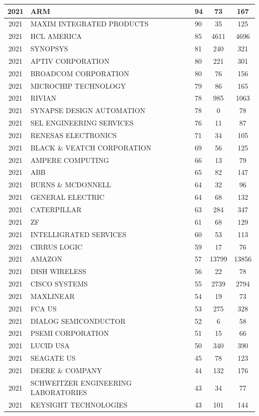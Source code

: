 \documentclass{article}%
\begin{document}
\begin{longtable}{c|p{20em}|p{5em}|c|c}
\hline%
2021&ARM&94&73&167\\%
\hline%
2021&MAXIM INTEGRATED PRODUCTS&90&35&125\\%
\hline%
2021&HCL AMERICA&85&4611&4696\\%
\hline%
2021&SYNOPSYS&81&240&321\\%
\hline%
2021&APTIV CORPORATION&80&221&301\\%
\hline%
2021&BROADCOM CORPORATION&80&76&156\\%
\hline%
2021&MICROCHIP TECHNOLOGY&79&86&165\\%
\hline%
2021&RIVIAN&78&985&1063\\%
\hline%
2021&SYNAPSE DESIGN AUTOMATION&78&0&78\\%
\hline%
2021&SEL ENGINEERING SERVICES&76&11&87\\%
\hline%
2021&RENESAS ELECTRONICS&71&34&105\\%
\hline%
2021&BLACK \& VEATCH CORPORATION&69&56&125\\%
\hline%
2021&AMPERE COMPUTING&66&13&79\\%
\hline%
2021&ABB&65&82&147\\%
\hline%
2021&BURNS \& MCDONNELL&64&32&96\\%
\hline%
2021&GENERAL ELECTRIC&64&68&132\\%
\hline%
2021&CATERPILLAR&63&284&347\\%
\hline%
2021&ZF&61&68&129\\%
\hline%
2021&INTELLIGRATED SERVICES&60&53&113\\%
\hline%
2021&CIRRUS LOGIC&59&17&76\\%
\hline%
2021&AMAZON&57&13799&13856\\%
\hline%
2021&DISH WIRELESS&56&22&78\\%
\hline%
2021&CISCO SYSTEMS&55&2739&2794\\%
\hline%
2021&MAXLINEAR&54&19&73\\%
\hline%
2021&FCA US&53&275&328\\%
\hline%
2021&DIALOG SEMICONDUCTOR&52&6&58\\%
\hline%
2021&PSEMI CORPORATION&51&15&66\\%
\hline%
2021&LUCID USA&50&340&390\\%
\hline%
2021&SEAGATE US&45&78&123\\%
\hline%
2021&DEERE \& COMPANY&44&132&176\\%
\hline%
2021&SCHWEITZER ENGINEERING LABORATORIES&43&34&77\\%
\hline%
2021&KEYSIGHT TECHNOLOGIES&43&101&144\\%

\end{longtable}
\end{document}
